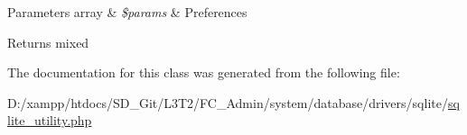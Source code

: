\begin{DoxyParams}[1]{Parameters}
array & {\em \$params} & Preferences \\
\hline
\end{DoxyParams}
\begin{DoxyReturn}{Returns}
mixed 
\end{DoxyReturn}


The documentation for this class was generated from the following file\+:\begin{DoxyCompactItemize}
\item 
D\+:/xampp/htdocs/\+S\+D\+\_\+\+Git/\+L3\+T2/\+F\+C\+\_\+\+Admin/system/database/drivers/sqlite/\hyperlink{sqlite__utility_8php}{sqlite\+\_\+utility.\+php}\end{DoxyCompactItemize}
